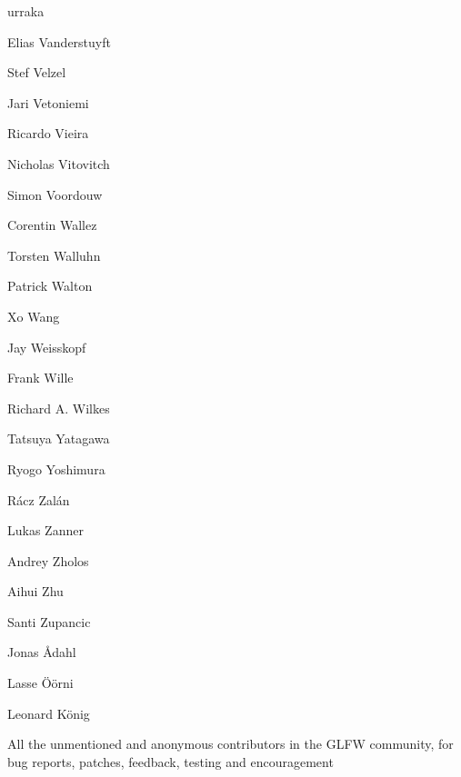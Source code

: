 \begin{DoxyItemize}
\item urraka
\item Elias Vanderstuyft
\item Stef Velzel
\item Jari Vetoniemi
\item Ricardo Vieira
\item Nicholas Vitovitch
\item Simon Voordouw
\item Corentin Wallez
\item Torsten Walluhn
\item Patrick Walton
\item Xo Wang
\item Jay Weisskopf
\item Frank Wille
\item Richard A. Wilkes
\item Tatsuya Yatagawa
\item Ryogo Yoshimura
\item Rácz Zalán
\item Lukas Zanner
\item Andrey Zholos
\item Aihui Zhu
\item Santi Zupancic
\item Jonas Ådahl
\item Lasse Öörni
\item Leonard König
\item All the unmentioned and anonymous contributors in the GLFW community, for bug reports, patches, feedback, testing and encouragement 
\end{DoxyItemize}